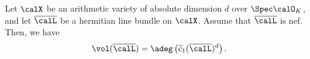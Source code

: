 

    \begin{theorem}\label{thm:arithmetic_Hilbert_Samuel}
        Let \(\calX\) be an arithmetic variety of absolute dimension \(d\) over \(\Spec \calO_K\), 
        and let \(\overline{\calL}\) be a hermitian line bundle on \(\calX\). 
        Assume that \(\overline{\calL}\) is nef. 
        Then, we have
        \[
            \vol(\overline{\calL}) = \adeg\left( \widehat{c}_1(\overline{\calL})^d \right).
        \]
    \end{theorem}
